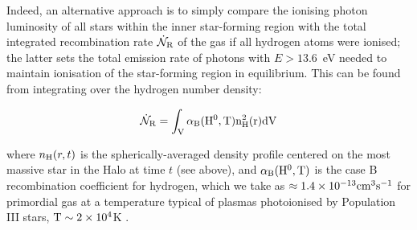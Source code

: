 \documentclass[twocolumn,iop,revtex4]{openjournal}
\begin{document}
Indeed, an alternative approach is to simply compare the ionising photon luminosity of all stars
within the inner star-forming region with the total integrated recombination rate $\dot{\mathcal{N}}_{\rm R}$ of the gas if
all hydrogen atoms were ionised; the latter sets the total emission rate of photons with
$E>13.6$~eV needed to maintain ionisation of the star-forming region in equilibrium. This can be
found from integrating over the hydrogen number density:

\begin{equation}
  \dot{\mathcal{N}}_{\rm R} = \int_{\rm{V}}\alpha_{\rm{B}}(\rm{H}^{0},T)n_{\rm{H}}^{2}(r)d\rm{V}
\end{equation}

\noindent where $n_{\rm{H}}(r, t)$ is the spherically-averaged density profile centered on the
most massive star in the Halo at time $t$ (see above), and $\alpha_{\rm{B}}(\rm{H}^{0},T)$ is the
case B recombination coefficient for hydrogen, which we take
as $\approx1.4\times 10^{-13}\rm{cm}^{3}\rm{s}^{-1}$ for primordial gas at a temperature typical of
plasmas photoionised by Population III stars, $\rm{T}\sim 2\times 10^{4}$K
\citep{Osterbrock2006, Johnson2012}. 
\end{document}
